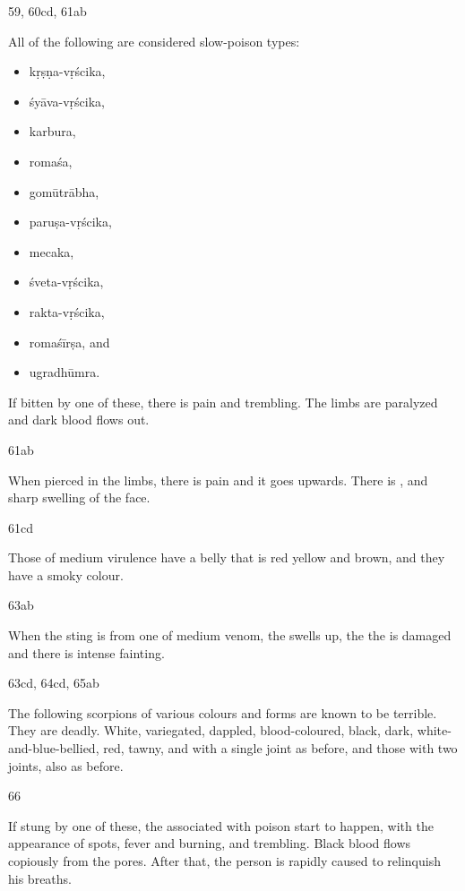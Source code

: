 \begin{translation}
\item [59, 60cd, 61ab]

All of the following are considered slow-poison types:
\begin{itemize}
    \item \Gls{kṛṣṇa-vṛścika},
    \item \Gls{śyāva-vṛścika},
    \item \Gls{karbura},
    \item \Gls{romaśa},
    \item \Gls{gomūtrābha},
    \item \Gls{paruṣa-vṛścika},
    \item \Gls{mecaka},
    \item \Gls{śveta-vṛścika},
    \item \Gls{rakta-vṛścika},
    \item \Gls{romaśīrṣa}, and
    \item \Gls{ugradhūmra}.    
\end{itemize}
If bitten by one of these, there is pain and trembling.  The limbs are paralyzed 
and dark blood flows out. 

\item[61ab]

When pierced in the limbs, there is pain and it goes upwards.  There is 
, and sharp swelling of the face.  

\item [61cd]

Those of medium virulence have a belly that is red
yellow and brown, and they have a smoky colour. 

\item[63ab]

When the sting is from one of medium venom, the  swells 
up, the the  is damaged and there is intense 
fainting.


\item[63cd, 64cd, 65ab]

The following scorpions of various colours and forms are known to be terrible.
They are deadly.
White, variegated, dappled, blood-coloured, black, dark, white-and-blue-bellied, 
red, tawny, and with a single joint as before, and those with two joints, also as 
before.

\item[66]

If stung by one of these, the  associated with poison start to 
happen, with the appearance of spots, fever and burning, and trembling.  Black 
blood flows copiously from the pores.  After that, the person is rapidly caused to 
relinquish his breaths. 


\end{translation}
